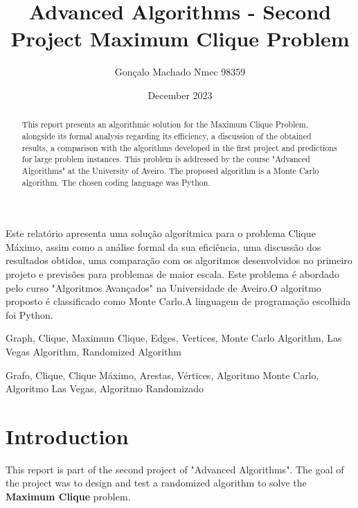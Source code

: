\documentclass[]{revdetua}
\title{Advanced Algorithms - Second Project \linebreak Maximum Clique Problem}
\author{Gonçalo Machado Nmec 98359}
\date{December 2023}
\begin{document}
\maketitle

\begin{abstract}
This report presents an algorithmic solution for the Maximum Clique Problem, alongside its formal analysis regarding its efficiency, a discussion of the obtained results, a comparison with the algorithms developed in the first project and predictions for large problem instances. This problem is addressed by the course "Advanced Algorithms" at the University of Aveiro. The proposed algorithm is a Monte Carlo algorithm. The chosen coding language was Python.
\end{abstract}

\begin{resumo}%
Este relatório apresenta uma solução algorítmica para o problema Clique Máximo, assim como a análise formal da sua eficiência, uma discussão dos resultados obtidos, uma comparação com os algoritmos desenvolvidos no primeiro projeto e previsões para problemas de maior escala. Este problema é abordado pelo curso "Algoritmos Avançados" na Universidade de Aveiro.O algoritmo proposto é classificado como Monte Carlo.A linguagem de programação escolhida foi Python.
\end{resumo}

\begin{keywords}
Graph, Clique, Maximum Clique, Edges, Vertices, Monte Carlo Algorithm, Las Vegas Algorithm, Randomized Algorithm
\end{keywords}

\begin{palavraschave}
Grafo, Clique, Clique Máximo, Arestas, Vértices, Algoritmo Monte Carlo, Algoritmo Las Vegas, Algoritmo Randomizado
\end{palavraschave}

\section{Introduction}
This report is part of the second project of "Advanced Algorithms". The goal of the project was to design and test a randomized algorithm to solve the \textbf{Maximum Clique} problem.
\end{document}
